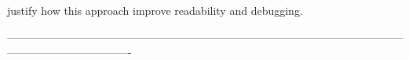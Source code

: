 
        justify how this approach improve readability and debugging. 











----------------------------------------------------------------------------------------------------------------------------------------------


